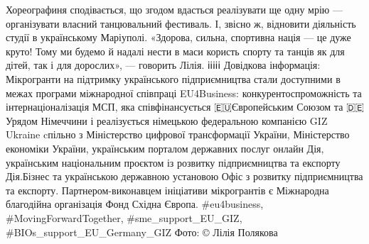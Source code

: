 Хореографиня сподівається, що згодом вдасться реалізувати ще одну мрію — організувати власний танцювальний фестиваль. І, звісно ж, відновити діяльність студії в українському Маріуполі.
«Здорова, сильна, спортивна нація — це дуже круто! Тому ми будемо й надалі нести в маси користь спорту та танців як для дітей, так і для дорослих», — говорить Лілія.
ℹ️ℹ️ℹ️ℹ️ℹ️ Довідкова інформація:
Мікрогранти на підтримку українського підприємництва стали доступними в межах програми міжнародної співпраці EU4Business: конкурентоспроможність та інтернаціоналізація МСП, яка співфінансується 🇪🇺Європейським Союзом та 🇩🇪Урядом Німеччини і реалізується німецькою федеральною компанією GIZ Ukraine cпільно з Міністерство цифрової трансформації України, Міністерство економіки України, українським порталом державних послуг онлайн Дія, українським національним проєктом із розвитку підприємництва та експорту Дія.Бізнес та українською державною установою Офіс з розвитку підприємництва та експорту. Партнером-виконавцем ініціативи мікрогрантів є Міжнародна благодійна організація Фонд Східна Європа.
#eu4business, #MovingForwardTogether, #sme_support_EU_GIZ, #BIOs_support_EU_Germany_GIZ
Фото: © Лілія Полякова
